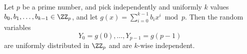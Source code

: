 \begin{theorem}
        Let $p$ be a prime number, and pick independently and
        uniformly $k$ values $b_0, b_1, \ldots, b_{k-1} \in \ZZ_p$,
        and let
        $g(x) = \sum_{i=0}^{k-1} b_i x^i \bmod p$. Then the
        random variables
        \begin{equation*}
            Y_0 = g(0), \ldots, Y_{p-1} = g(p-1)
        \end{equation*}
        are uniformly distributed in $\ZZ_p$ and are $k$-wise independent.
    \end{theorem}
